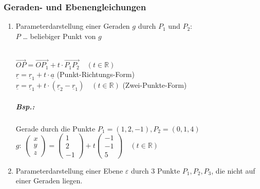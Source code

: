 \subsubsection{Geraden- und Ebenengleichungen}
\begin{enumerate}
\item Parameterdarstellung einer Geraden $g$ durch $P_1$ und $P_2$:\\
$P$ … beliebiger Punkt von $g$\\
\\
$\overrightarrow{OP}=\overrightarrow{OP_1}+t\cdot \overrightarrow{P_1P_2} \quad ( t \in \mathbb{R})$\\
$\boxed{\underline{r}=\underline{r}_1+t \cdot \underline{a}}$ (Punkt-Richtungs-Form)\\
$\boxed{\underline{r}=\underline{r}_1 + t \cdot (\underline{r}_2-\underline{r}_1)} \quad( t \in \mathbb{R})$ (Zwei-Punkte-Form)
\subparagraph{Bsp.:} \parskp
Gerade durch die Punkte $P_1=(1,2,-1), P_2=(0,1,4)$\\
$g: \; \begin{pmatrix}
x\\
y\\
z
\end{pmatrix}=\begin{pmatrix}
1\\
2\\
-1
\end{pmatrix}+t\begin{pmatrix}
-1\\
-1\\
5
\end{pmatrix}\quad (t \in \mathbb{R})$
\item Parameterdarstellung einer Ebene $\varepsilon$ durch 3 Punkte $P_1, P_2 ,P_3$, die nicht auf einer Geraden liegen.\\

\end{enumerate}
